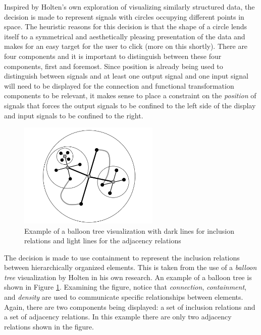 Inspired by Holten's own exploration of visualizing similarly structured data, the decision is made to represent signals with circles occupying different points in space. The heuristic reasons for this decision is that the shape of a circle lends itself to a symmetrical and aesthetically pleasing presentation of the data and makes for an easy target for the user to click (more on this shortly). There are four components and it is important to distinguish between these four components, first and foremost. Since position is already being used to distinguish between signals and at least one output signal and one input signal will need to be displayed for the connection and functional transformation components to be relevant, it makes sense to place a constraint on the \emph{position} of signals that forces the output signals to be confined to the left side of the display and input signals to be confined to the right.

\begin{figure}[htb]
\centering
\includegraphics[width=0.6\textwidth]{holten_balloon.png}
\caption{Example of a balloon tree visualization with dark lines for inclusion relations and light lines for the adjacency relations}
\label{fig:balloonTree}
\end{figure}

The decision is made to use containment to represent the inclusion relations between hierarchically organized elements. This is taken from the use of a \emph{balloon tree} visualization by Holten in his own research. An example of a balloon tree is shown in Figure \ref{fig:balloonTree}. Examining the figure, notice that \emph{connection}, \emph{containment}, and \emph{density} are used to communicate specific relationships between elements. Again, there are two components being displayed: a set of inclusion relations and a set of adjacency relations. In this example there are only two adjacency relations shown in the figure. 

